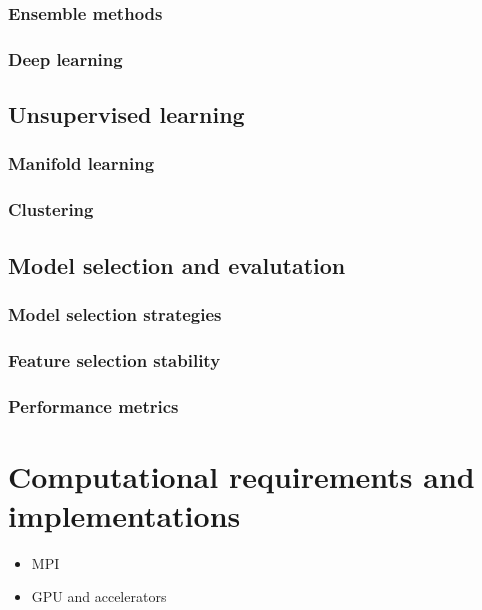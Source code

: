     \subsubsection{Ensemble methods}
    \subsubsection{Deep learning}


  \subsection{Unsupervised learning} \label{subsec:unsupervised_learning}
    \subsubsection{Manifold learning}
    \subsubsection{Clustering}


  \subsection{Model selection and evalutation} \label{subsec:model_selection}
    \subsubsection{Model selection strategies}
    \subsubsection{Feature selection stability}
    \subsubsection{Performance metrics}


\section{Computational requirements and implementations} \label{sec:implementation}
\begin{itemize}
  \item MPI
  \item GPU and accelerators
\end{itemize}

